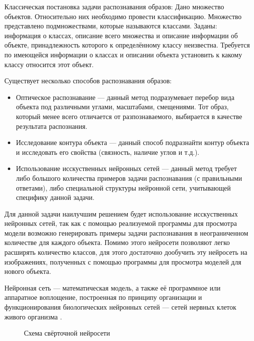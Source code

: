 Классическая постановка задачи распознавания образов: Дано множество объектов. Относительно них необходимо провести классификацию. Множество представлено подмножествами, которые называются классами. Заданы: информация о классах, описание всего множества и описание информации об объекте, принадлежность которого к определённому классу неизвестна. Требуется по имеющейся информации о классах и описании объекта установить к какому классу относится этот объект.

Существует несколько способов распознавания образов:
\begin{itemize}
\item Оптическое распознавание --- данный метод подразумевает перебор вида объекта под различными углами, масштабами, смещениями. Тот образ, который менее всего отличается от разпознаваемого, выбирается в качестве результата распознания.
\item Исследование контура объекта --- данный способ подразнайти контур объекта и исследовать его свойства (связность, наличие углов и т.д.).
\item Использование исскуственных нейронных сетей ---  данный метод требует либо большого количества примеров задачи распознавания (с правильными ответами), либо специальной структуры нейронной сети, учитывающей специфику данной задачи.
\end{itemize}

Для данной задачи наилучшим решением будет использование исскуственных нейронных сетей, так как с помощью реализуемой программы для просмотра модели возможно генерировать примеры задачи распознавания в неограниченном количестве для каждого объекта. Помимо этого нейросети позволяют легко расширять количество классов, для этого достаточно дообучить эту нейросеть на изображениях, полученных с помощью программы для просмотра моделей для нового объекта.

Нейронная сеть --- математическая модель, а также её программное или аппаратное воплощение, построенная по принципу организации и функционирования биологических нейронных сетей --- сетей нервных клеток живого организма \cite{nn}.

\begin{figure}[H]
	\caption{Схема свёрточной нейросети}
\end{figure}


